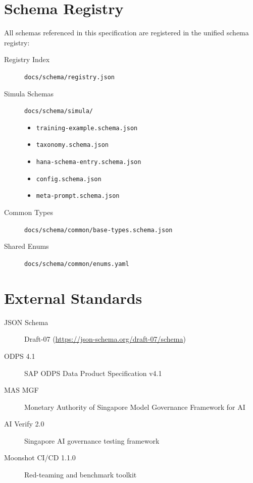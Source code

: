 \section{Schema Registry}

All schemas referenced in this specification are registered in the unified
schema registry:

\begin{description}
\item[Registry Index] \texttt{docs/schema/registry.json}
\item[Simula Schemas] \texttt{docs/schema/simula/}
  \begin{itemize}
    \item \texttt{training-example.schema.json}
    \item \texttt{taxonomy.schema.json}
    \item \texttt{hana-schema-entry.schema.json}
    \item \texttt{config.schema.json}
    \item \texttt{meta-prompt.schema.json}
  \end{itemize}
\item[Common Types] \texttt{docs/schema/common/base-types.schema.json}
\item[Shared Enums] \texttt{docs/schema/common/enums.yaml}
\end{description}

\section{External Standards}

\begin{description}
\item[JSON Schema] Draft-07 (\url{https://json-schema.org/draft-07/schema})
\item[ODPS 4.1] SAP ODPS Data Product Specification v4.1
\item[MAS MGF] Monetary Authority of Singapore Model Governance Framework for AI
\item[AI Verify 2.0] Singapore AI governance testing framework
\item[Moonshot CI/CD 1.1.0] Red-teaming and benchmark toolkit
\end{description}